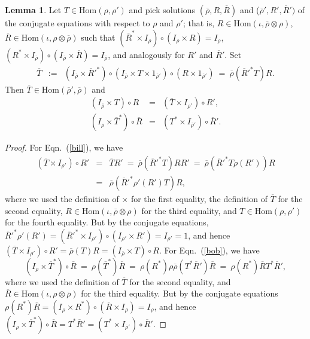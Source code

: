 \documentclass[12pt]{article}
\theoremstyle{definition}
\newtheorem{lemma}[thm]{Lemma}
\theoremstyle{definition}
\theoremstyle{remark}
\def\ol#1{{\overline #1}}
\newcommand{\Hom}{\mathrm{Hom}}
\begin{document}
\begin{lemma} Let $T\in \Hom (\rho ,\rho ')$ and pick solutions
  $(\overline{\rho},R,\overline{R})$ and ($\overline{\rho}',R',\overline{R}')$ of the
  conjugate equations with respect to $\rho$ and $\rho'$; that is, $R\in \Hom (\iota
  , \overline{\rho}\otimes \rho )$, $\overline{R}\in \Hom (\iota ,\rho \otimes
  \overline{\rho})$ such that $(\overline{R}^*\times I_\rho)\circ (I_\rho \times
  R)=I_{\rho}$, $(R^*\times I_{\overline{\rho}})\circ (I_{\overline{\rho}}\times
  \overline{R})=I_{\overline{\rho}}$, and analogously for $R'$ and $\overline{R}'$.
  Set
\begin{eqnarray*} 
  \overline{T} &:= & (I_{\overline{\rho}}\times \overline{R}'^*)\circ
  (I_{\overline{\rho}}\times T\times 1_{\overline{\rho}'})\circ (R\times
  1_{\overline{\rho}'}) \: =\: \ol\rho (\ol R'^*T)R .\end{eqnarray*}
Then $\overline{T}\in \Hom (\overline{\rho}',\overline{\rho})$ and 
\begin{eqnarray}
  (I_{\overline{\rho}}\times T)\circ R &=& (\overline{T}\times I_{\rho '})\circ R'
  , \label{bill} \\
  (I_\rho \times \overline{T}^*)\circ \overline{R} &=& (T^*\times
  I_{\overline{\rho}'})\circ \overline{R}' \label{bob} .\end{eqnarray}
\end{lemma}

\begin{proof} 
  For Eqn.\ (\ref{bill}), we have
\begin{eqnarray*}
  (\overline{T}\times I_{\rho'})\circ R' &=& \overline{T}R'
  \: =\: \overline{\rho}(\overline{R}'^*T)RR' \: =\:
  \overline{\rho}(\overline{R}'^*T\rho (R'))R \\
  &=& \overline{\rho}(\overline{R}'^*\rho '(R')T)R ,\end{eqnarray*}
where we used the definition of $\times$ for the first equality, the definition of
$\overline{T}$ for the second equality, $R\in \Hom (\iota ,\overline{\rho}\otimes \rho )$ for
the third equality, and $T\in \Hom (\rho ,\rho ')$ for the fourth equality. 
But by the conjugate equations, $\overline{R}'^*\rho '(R')=(\overline{R}'^*\times I_{\rho'})\circ (I_{\rho '}\times
R')=I_{\rho '}=1$, and hence $(\overline{T}\times I_{\rho'})\circ
R'=\overline{\rho}(T)R=(I_{\overline{\rho}}\times T)\circ R$.  For Eqn.\ (\ref{bob}),
we have 
\begin{equation}
  (I_{\rho}\times \overline{T}^*)\circ \overline{R} \: =\: \rho
  (\overline{T}^*)\overline{R} \: =\: \rho (R^*)\rho
  \overline{\rho}(T^*\overline{R}')\overline{R} \: =\: \rho
  (R^*)\overline{R}T^*\overline{R}' ,\end{equation}  
where we used the definition of $\overline{T}$ for the second equality, and
$\overline{R}\in \Hom (\iota ,\rho \otimes \overline{\rho})$ for the third equality.  But by the
conjugate equations $\rho (R^*)\overline{R}=(I_{\rho}\times R^*)\circ
(\overline{R}\times I_{\rho})=I_{\rho}$, and hence $(I_{\rho}\times
\overline{T}^*)\circ \overline{R}=T^*\overline{R}'=(T^*\times
I_{\overline{\rho}'})\circ \overline{R}'$.  
\end{proof}
\end{document}
